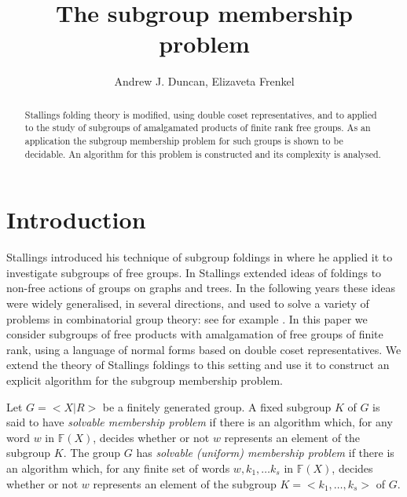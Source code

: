 \documentclass[a4paper,12pt]{article}
\title{The subgroup membership problem
}
\author{Andrew J. Duncan, Elizaveta Frenkel}
\numberwithin{equation}{section}
\numberwithin{figure}{section}
\newcommand{\FF}{\ensuremath{\mathbb{F}}}
\begin{document}
\maketitle

\begin{abstract}
Stallings folding theory is modified, using double coset representatives, and to applied 
to the study of subgroups of  amalgamated
products of finite rank free groups. As an application the 
 subgroup membership
problem for such groups is shown to be decidable. An algorithm for this
problem is constructed and its complexity is analysed.
 \end{abstract}



\section{Introduction}\label{se:global_intro}

Stallings introduced his technique of subgroup foldings in 
\cite{stallings83} where he applied it to investigate subgroups of 
free groups. In \cite{stallings88} Stallings extended ideas of
foldings to non-free actions of groups on graphs and trees. In the following 
years these ideas were widely generalised, in several
directions,  and used to solve a variety of  problems in
combinatorial group theory: see for example
\cite{befe,BoWei,KM02,SilvaWeil08}. 
In this paper we consider  subgroups
of free products with amalgamation of free groups of finite rank, using
a language of normal forms based on double coset representatives.  We
extend the theory  of Stallings foldings to this setting and use it to construct an
explicit algorithm for the subgroup membership problem.

Let $G = <X|R>$ be a finitely generated group. 
A fixed subgroup $K$ of $G$ is said to have 
\emph{solvable  membership problem} if there is an algorithm which, for
any word $w$ in $\FF(X)$, decides
whether or not $w$ represents an element of  the subgroup $K$. 
The group $G$ has 
\emph{solvable  (uniform) membership problem} if there is an algorithm which, for
any finite set of words $w, k_1, \ldots k_s$ in $\FF(X)$, decides
whether or not $w$ represents an element of  the subgroup $K = <k_1,
\ldots, k_s>$ of $G$. 
\end{document}
